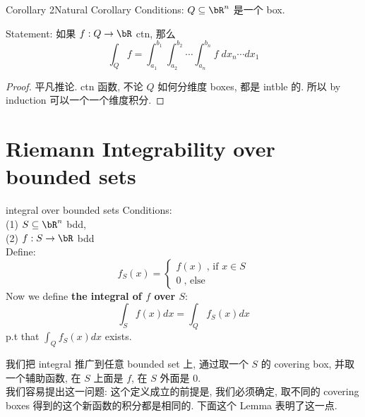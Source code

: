 \documentclass[lang=cn,11pt]{elegantbook}
\begin{document}
\begin{corollary}{Corollary 2}{Natural Corollary}
Conditions: $Q \subseteq \bR ^ n$ 是一个 box.

Statement: 如果 $f: Q \rightarrow \bR$ ctn, 那么
$$
\int_Q f = \int^{b_1}_{a_1} \int^{b_2}_{a_2} \cdots \int^{b_n}_{a_n} f \; d x_n \cdots d x_1
$$
\end{corollary}

\begin{proof}
    平凡推论. ctn 函数, 不论 $Q$ 如何分维度 boxes, 都是 intble 的. 所以 by induction 可以一个一个维度积分.
\end{proof}






\section{Riemann Integrability over bounded sets}

\begin{definition}{integral over bounded sets}
    Conditions:\\
    (1) $S \sub \bR^n$ bdd, \\
    (2) $f: S \rightarrow \bR$ bdd\\
    Define: 
    $$
    f_S (x) = \begin{cases}
        f(x) \; \text{, if } x \in S \\
        0 \; \text{, else}
    \end{cases}
   $$
   Now we define \textbf{the integral of $f$ over $S$}: 
   $$
   \int_S f(x) dx = \int_Q f_S (x) dx
   $$
   p.t that $\int_Q f_S (x) dx$ exists.
\end{definition}
\begin{remark}
    我们把 integral 推广到任意 bounded set 上, 通过取一个 $S$ 的 covering box, 并取一个辅助函数, 在 $S$ 上面是 $f$, 在 $S$ 外面是 $0$.\\
    我们容易提出这一问题: 这个定义成立的前提是, 我们必须确定, 取不同的 covering boxes 得到的这个新函数的积分都是相同的. 下面这个 Lemma 表明了这一点. 
\end{remark}
\end{document}
